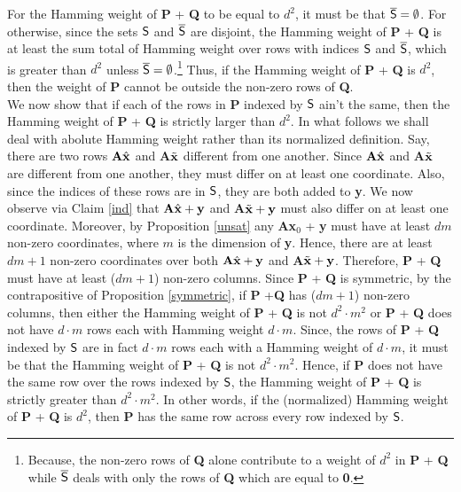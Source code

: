 \noindent For the Hamming weight of {\bf P} + {\bf Q} to be 
equal to $d^2$, it must be that $\overline{{\sf S}} = \emptyset$. For 
otherwise, since the sets ${\sf S}$ and $\overline{{\sf S}}$  are disjoint, the 
Hamming weight of {\bf P} + {\bf Q} is at least the sum total of Hamming
weight over rows with indices ${\sf S}$ and $\overline{{\sf S}}$, which is greater 
than $d^2$ unless $\overline{{\sf S}} = \emptyset$.\footnote{Because, the non-zero rows of 
{\bf Q} alone contribute to a weight of $d^2$ in {\bf P} + {\bf Q} while $\overline{{\sf S}}$ deals with 
only the rows of {\bf Q} which are equal to {\bf 0}.} Thus, if the 
Hamming weight of {\bf  P} + {\bf Q} is $d^2$, then the 
weight of {\bf P} cannot be outside the non-zero rows of {\bf Q}.\\

\noindent We now show that if each of the rows in {\bf P} indexed by ${\sf S}$ ain't the 
same, then the Hamming weight of {\bf P} + {\bf Q} is strictly larger than $d^2$. In what follows
we shall deal with abolute Hamming weight rather than its normalized definition. Say, there are two rows ${\bf A}\hat{\bf
    x}$ and {\bf A}$\tilde{\bf x}$ different from one another. Since 
${\bf A}\hat{\bf  x}$ and {\bf A}$\tilde{\bf x}$ are different from one another, they must differ on at least one coordinate.
Also, since the indices of these rows are in ${\sf S}$, they are both added to {\bf y}.
We now observe via Claim \ref{ind} that ${\bf A}\hat{\bf
    x} + {\bf y}$ and {\bf A}$\tilde{\bf x} + {\bf y}$ must also
  differ on at least one coordinate. Moreover, by Proposition
  \ref{unsat} any {\bf Ax$_0$} + {\bf y} must have at least $dm$ non-zero
  coordinates, where $m$ is the dimension of {\bf y}. Hence, there are 
at least $dm + 1$ non-zero coordinates over
  both ${\bf A}\hat{\bf x} + {\bf y}$ and {\bf A}$\tilde{\bf x} + {\bf
    y}$. Therefore, {\bf P} + {\bf Q} must have at least
  ($dm + 1$) non-zero columns. Since {\bf P} + {\bf Q} is symmetric, by 
the contrapositive of Proposition \ref{symmetric}, if {\bf P} +{\bf Q}
has ($dm + 1$) non-zero columns, then either the Hamming weight of {\bf P} + {\bf Q} 
is not $d^2 \cdot m^2$ or {\bf P} + {\bf Q} does not have $d \cdot m$ rows each with 
Hamming weight $d \cdot m$. Since, the rows of {\bf P} + {\bf Q} indexed by ${\sf S}$ are in fact 
$d \cdot m$ rows each with a Hamming weight of $d \cdot m$, it must be that 
the Hamming weight of {\bf P} + {\bf Q} is not $d^2 \cdot m^2$. Hence, if {\bf P} does 
not have the same row over the rows indexed by ${\sf S}$, the Hamming weight of 
  {\bf P} + {\bf Q} is strictly greater than $d^2 \cdot m^2$. In other words, if the
(normalized) Hamming weight of {\bf P} + {\bf Q} is $d^2$, then {\bf P} has the 
same row across every row indexed by ${\sf S}$.  \\


